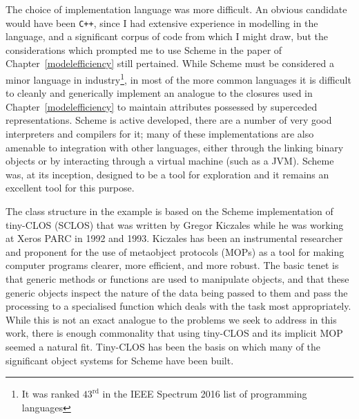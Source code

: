 The choice of implementation language was more difficult.  An obvious
candidate would have been \texttt{C++}, since I had extensive
experience in modelling in the language, and a significant corpus of
code from which I might draw, but the considerations which prompted me
to use Scheme in the paper of Chapter~\ref{modelefficiency} still
pertained. While Scheme must be considered a minor language in
industry\footnote{It was ranked $43^{\text{rd}}$ in the IEEE Spectrum 2016 list
of programming languages}, in most of the more common languages it
is difficult to cleanly and generically implement an analogue to the
closures used in Chapter~\ref{modelefficiency} to maintain attributes
possessed by superceded representations.  Scheme is active developed,
there are a number of very good interpreters and compilers for it;
many of these implementations are also amenable to integration with
other languages, either through the linking binary objects or by
interacting through a virtual machine (such as a JVM).
Scheme was, at its inception, designed to be a tool for exploration
\cite{sussman1998first} and it remains an excellent tool for this
purpose.

The class structure in the example is based on the Scheme
implementation of tiny-CLOS (SCLOS) that was written by Gregor Kiczales
\cite{kiczales1993xerox} while he was working at Xeros PARC in 1992
and 1993.  Kiczales has been an instrumental researcher and proponent
for the use of metaobject protocols (MOPs) as a tool for making
computer programs clearer, more efficient, and more robust.  The basic
tenet is that generic methods or functions are used to manipulate
objects, and that these generic objects inspect the nature of the data
being passed to them and pass the processing to a specialised function
which deals with the task most appropriately.  While this is not an
exact analogue to the problems we seek to address in this work, there
is enough commonality that using tiny-CLOS and its implicit MOP seemed
a natural fit.  Tiny-CLOS has been the basis on which many of the
significant object systems for Scheme have been built.

